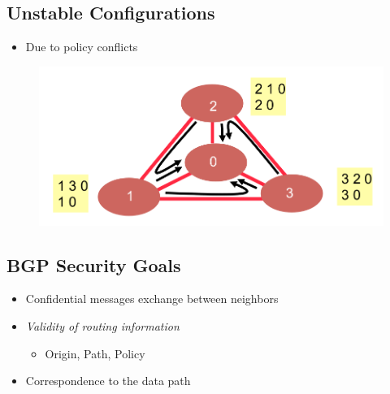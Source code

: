 \subsection{Unstable Configurations}
\begin{itemize}[nosep]
    \item Due to policy conflicts
\end{itemize}
\begin{figure}[H]
    \includegraphics[scale=0.25]{lazy/unstableconfigurations.png}
\end{figure}

\subsection{BGP Security Goals}
\begin{itemize}[nosep]
    \item Confidential messages exchange between neighbors
    \item \emph{Validity of routing information}
          \begin{itemize}[nosep]
              \item Origin, Path, Policy
          \end{itemize}
    \item Correspondence to the data path
\end{itemize}

